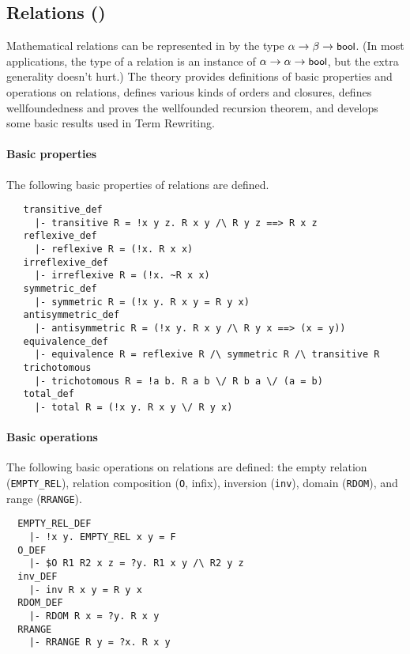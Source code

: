 \subsection{Relations ()}\label{relation}

Mathematical relations can be represented in \HOL{} by the type
$\alpha \to\beta\to\mbox{\small{\textbf{\sf{bool}}}}$. (In most applications, the type of a
relation is an instance of $\alpha \to\alpha\to\mbox{\small{\textbf{\sf{bool}}}}$, but the
extra generality doesn't hurt.) The theory 
provides definitions of basic properties and operations on relations,
defines various kinds of orders and closures, defines wellfoundedness
and proves the wellfounded recursion theorem, and develops some
basic results used in Term Rewriting.

\paragraph {Basic properties}

The following basic properties of relations are defined.
%
\begin{hol}
{\small
\begin{verbatim}
   transitive_def
     |- transitive R = !x y z. R x y /\ R y z ==> R x z
   reflexive_def
     |- reflexive R = (!x. R x x)
   irreflexive_def
     |- irreflexive R = (!x. ~R x x)
   symmetric_def
     |- symmetric R = (!x y. R x y = R y x)
   antisymmetric_def
     |- antisymmetric R = (!x y. R x y /\ R y x ==> (x = y))
   equivalence_def
     |- equivalence R = reflexive R /\ symmetric R /\ transitive R
   trichotomous
     |- trichotomous R = !a b. R a b \/ R b a \/ (a = b)
   total_def
     |- total R = (!x y. R x y \/ R y x)
\end{verbatim}
}
\end{hol}

\paragraph{Basic operations}

The following basic operations on relations are defined: the empty
relation ({\small\verb+EMPTY_REL+}), relation composition
({\small\verb+O+, infix}), inversion ({\small\verb+inv+}),
domain ({\small\verb+RDOM+}), and range ({\small\verb+RRANGE+}).
%
\begin{hol}
{\small
\begin{verbatim}
  EMPTY_REL_DEF
    |- !x y. EMPTY_REL x y = F
  O_DEF
    |- $O R1 R2 x z = ?y. R1 x y /\ R2 y z
  inv_DEF
    |- inv R x y = R y x
  RDOM_DEF
    |- RDOM R x = ?y. R x y
  RRANGE
    |- RRANGE R y = ?x. R x y
\end{verbatim}
}
\end{hol}

